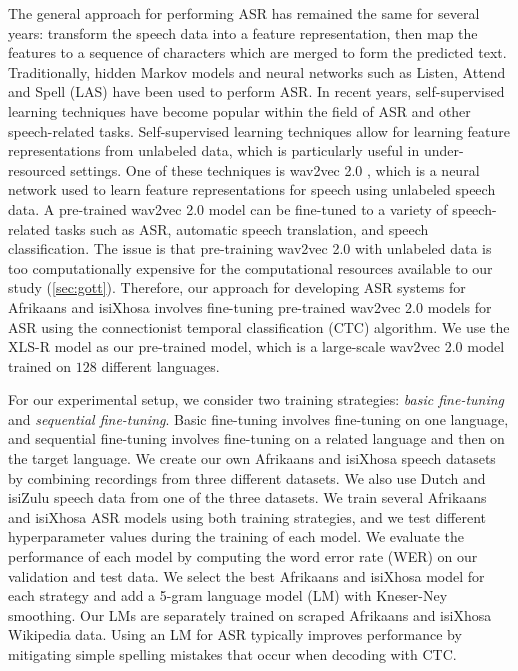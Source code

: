The general approach for performing ASR has remained the same for several years:
transform the speech data into a feature representation, then map the features to a sequence of characters which are merged to form the predicted text.
Traditionally, hidden Markov models \cite{hmmcite} and neural networks such as Listen, Attend and Spell (LAS) \cite{chan2015listen} have been used to perform ASR.
In recent years, self-supervised learning techniques have become popular within the field of ASR and other speech-related tasks.
Self-supervised learning techniques allow for learning feature representations from unlabeled data, which is particularly useful in under-resourced settings.
One of these techniques is wav2vec 2.0 \cite{baevski2020wav2vec}, which is a neural network used to learn feature representations for speech using unlabeled speech data.
A pre-trained wav2vec 2.0 model can be fine-tuned to a variety of speech-related tasks such as ASR, automatic speech translation, and speech classification.
The issue is that pre-training wav2vec 2.0 with unlabeled data is too computationally expensive for the computational resources available to our study (\ref{sec:gott}).
Therefore, our approach for developing ASR systems for Afrikaans and isiXhosa involves fine-tuning pre-trained wav2vec 2.0 models for ASR using the connectionist temporal classification (CTC) algorithm.
We use the XLS-R \cite{babu2021xls} model as our pre-trained model, which is a large-scale wav2vec 2.0 model trained on $128$ different languages.

For our experimental setup, we consider two training strategies: \emph{basic fine-tuning} and \emph{sequential fine-tuning}.
Basic fine-tuning involves fine-tuning on one language, and sequential fine-tuning involves fine-tuning on a related language and then on the target language.
We create our own Afrikaans and isiXhosa speech datasets by combining recordings from three different datasets. We also use Dutch and isiZulu speech data from one of the three datasets.
We train several Afrikaans and isiXhosa ASR models using both training strategies, and we test different hyperparameter values during the training of each model.
We evaluate the performance of each model by computing the word error rate (WER) on our validation and test data.
We select the best Afrikaans and isiXhosa model for each strategy and add a 5-gram language model (LM) with Kneser-Ney smoothing. 
Our LMs are separately trained on scraped Afrikaans and isiXhosa Wikipedia data.
Using an LM for ASR typically improves performance by mitigating simple spelling mistakes that occur when decoding with CTC.

